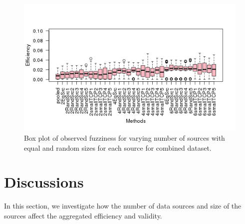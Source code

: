 \documentclass[main]{subfiles}
\begin{document}
\begin{figure}[H]
\begin{center}


 
  \includegraphics[scale=0.8]{images/boxplotCombined_eff}
\caption{Box plot of observed fuzziness for varying number of sources with equal and random sizes for each source for combined dataset.}\label{fig:boxplotCombined}
\end{center}
\end{figure}




\section{Discussions}
In this section,  we investigate how the number of data sources and size of the sources affect the aggregated efficiency and validity.



\end{document}

